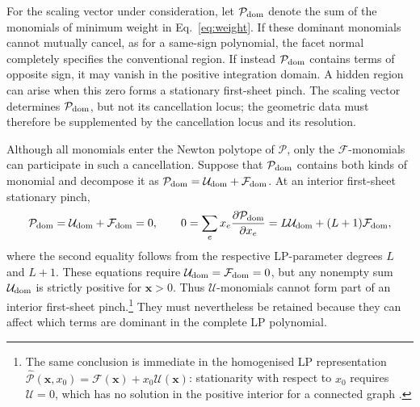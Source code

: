 \documentclass[a4paper,11pt]{article}
\newcommand{\x}{\boldsymbol{x}}
\begin{document}
For the scaling vector under consideration, let \(\mathcal P_{\rm dom}\)
denote the sum of the monomials of minimum weight in Eq.~\eqref{eq:weight}.
If these dominant monomials cannot mutually cancel, as for a
same-sign polynomial, the facet normal completely specifies the conventional
region.  If instead \(\mathcal P_{\rm dom}\) contains terms of opposite sign,
it may vanish in the positive integration domain.  A hidden region can arise
when this zero forms a stationary first-sheet pinch.  The scaling vector
determines \(\mathcal P_{\rm dom}\), but not its cancellation locus; the
geometric data must therefore be supplemented by the cancellation locus and
its resolution.

Although all monomials enter the Newton polytope of \(\mathcal P\), only the
\(\mathcal F\)-monomials can participate in such a cancellation.  Suppose that
\(\mathcal P_{\rm dom}\) contains both kinds of monomial and decompose it as
\(\mathcal P_{\rm dom}=\mathcal U_{\rm dom}+\mathcal F_{\rm dom}\).  At an
interior first-sheet stationary pinch,
\begin{equation}
 \mathcal P_{\rm dom}=\mathcal U_{\rm dom}+\mathcal F_{\rm dom}=0,
 \qquad
 0=\sum_e x_e\frac{\partial\mathcal P_{\rm dom}}{\partial x_e}
 =L\mathcal U_{\rm dom}+(L+1)\mathcal F_{\rm dom},
 \label{eq:no-U-mixed-pinch}
\end{equation}
where the second equality follows from the respective LP-parameter degrees
\(L\) and \(L+1\).  These equations require
\(\mathcal U_{\rm dom}=\mathcal F_{\rm dom}=0\), but any nonempty sum
\(\mathcal U_{\rm dom}\) is strictly positive for \(\x>0\).  Thus
\(\mathcal U\)-monomials cannot form part of an interior first-sheet
pinch.\footnote{The same conclusion is immediate in the homogenised LP
representation
\(\widehat{\mathcal P}(\x,x_0)=\mathcal F(\x)+x_0\mathcal U(\x)\): stationarity
with respect to \(x_0\) requires \(\mathcal U=0\), which has no solution in the
positive interior for a connected graph \cite{Chen:2019mqc}.} They must
nevertheless be retained because they can affect which terms are dominant in
the complete LP polynomial.
\end{document}
